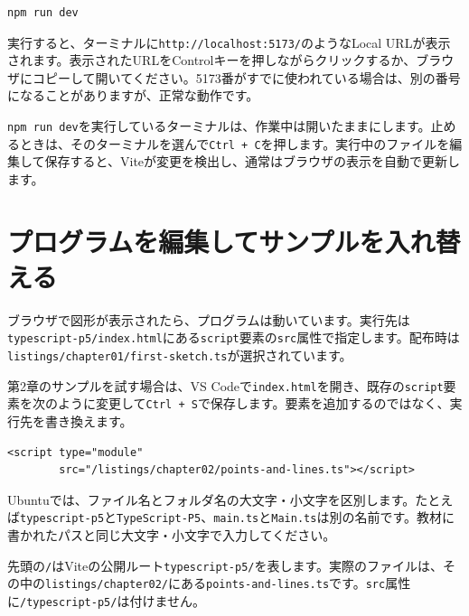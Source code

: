 \begin{listing}[htbp]
\begin{verbatim}
npm run dev
\end{verbatim}
\caption{Viteの開発サーバを起動するコマンド}
\label{lst:appendix-ubuntu-npm-run-dev}
\end{listing}

実行すると、ターミナルに\texttt{http://localhost:5173/}のようなLocal URLが表示されます。表示されたURLをControlキーを押しながらクリックするか、ブラウザにコピーして開いてください。5173番がすでに使われている場合は、別の番号になることがありますが、正常な動作です。

\texttt{npm run dev}を実行しているターミナルは、作業中は開いたままにします。止めるときは、そのターミナルを選んで\texttt{Ctrl + C}を押します。実行中のファイルを編集して保存すると、Viteが変更を検出し、通常はブラウザの表示を自動で更新します。

\section{プログラムを編集してサンプルを入れ替える}

ブラウザで図形が表示されたら、プログラムは動いています。実行先は\texttt{typescript-p5/index.html}にある\texttt{script}要素の\texttt{src}属性で指定します。配布時は\texttt{listings/chapter01/first-sketch.ts}が選択されています。

第2章のサンプルを試す場合は、VS Codeで\texttt{index.html}を開き、既存の\texttt{script}要素を次のように変更して\texttt{Ctrl + S}で保存します。要素を追加するのではなく、実行先を書き換えます。

\begin{listing}[htbp]
\begin{verbatim}
<script type="module"
        src="/listings/chapter02/points-and-lines.ts"></script>
\end{verbatim}
\caption{第2章のサンプルを直接実行する指定}
\label{lst:appendix-ubuntu-copy-sample}
\end{listing}

Ubuntuでは、ファイル名とフォルダ名の大文字・小文字を区別します。たとえば\texttt{typescript-p5}と\texttt{TypeScript-P5}、\texttt{main.ts}と\texttt{Main.ts}は別の名前です。教材に書かれたパスと同じ大文字・小文字で入力してください。

先頭の\texttt{/}はViteの公開ルート\texttt{typescript-p5/}を表します。実際のファイルは、その中の\texttt{listings/chapter02/}にある\texttt{points-and-lines.ts}です。\texttt{src}属性に\texttt{/typescript-p5/}は付けません。

